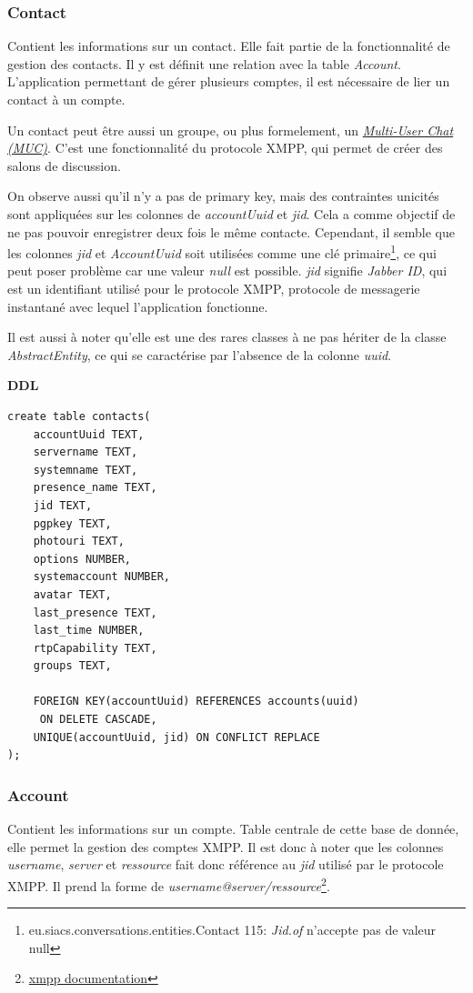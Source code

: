 \documentclass[a4paper,11pt]{article}
\begin{document}
\subsubsection{Contact}
Contient les informations sur un contact. Elle fait partie de la fonctionnalité de gestion des contacts. Il y est définit une relation avec la table \textit{Account}. L'application permettant de gérer plusieurs comptes, il est nécessaire de lier un contact à un compte.

Un contact peut être aussi un groupe, ou plus formelement, un \href{https://xmpp.org/extensions/xep-0045.html}{\textit{Multi-User Chat (MUC)}}. C'est une fonctionnalité du protocole XMPP, qui permet de créer des salons de discussion.

On observe aussi qu'il n'y a pas de primary key, mais des contraintes unicités sont appliquées sur les colonnes de \textit{accountUuid} et \textit{jid}. Cela a comme objectif de ne pas pouvoir enregistrer deux fois le même contacte. Cependant, il semble que les colonnes \textit{jid} et \textit{AccountUuid} soit utilisées comme une clé primaire\footnote{eu.siacs.conversations.entities.Contact 115: \textit{Jid.of} n'accepte pas de valeur null}, ce qui peut poser problème car une valeur \textit{null} est possible. \textit{jid} signifie \textit{Jabber ID}, qui est un identifiant utilisé pour le protocole XMPP, protocole de messagerie instantané avec lequel l'application fonctionne.

Il est aussi à noter qu'elle est une des rares classes à ne pas hériter de la classe \textit{AbstractEntity}, ce qui se caractérise par l'absence de la colonne \textit{uuid}.

\textbf{DDL}
\begin{lstlisting}
create table contacts(
    accountUuid TEXT,
    servername TEXT, 
    systemname TEXT,
    presence_name TEXT,
    jid TEXT,
    pgpkey TEXT,
    photouri TEXT,
    options NUMBER,
    systemaccount NUMBER,
    avatar TEXT,
    last_presence TEXT,
    last_time NUMBER, 
    rtpCapability TEXT,
    groups TEXT, 
    
    FOREIGN KEY(accountUuid) REFERENCES accounts(uuid) 
     ON DELETE CASCADE,
    UNIQUE(accountUuid, jid) ON CONFLICT REPLACE
);
\end{lstlisting}
\subsubsection{Account}
Contient les informations sur un compte. Table centrale de cette base de donnée, elle permet la gestion des comptes XMPP. Il est donc à noter que les colonnes \textit{username}, \textit{server} et \textit{ressource} fait donc référence au \textit{jid} utilisé par le protocole XMPP. Il prend la forme de \textit{username@server/ressource}\footnote{\href{https://xmpp.org/extensions/xep-0029.html}{xmpp documentation}}.
\end{document}
